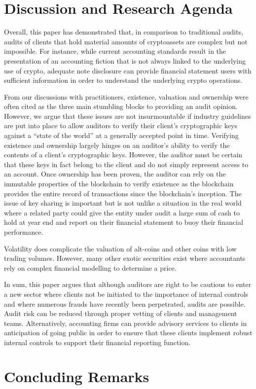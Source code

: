 \section{Discussion and Research Agenda}

Overall, this paper has demonstrated that, in comparison to traditional audits, audits of clients that hold material amounts of cryptoassets are complex but not impossible. For instance, while current accounting standards result in the presentation of an accounting fiction that is not always linked to the underlying use of crypto, adequate note disclosure can provide financial statement users with sufficient information in order to understand the underlying crypto operations. 

From our discussions with practitioners, existence, valuation and ownership were often cited as the three main stumbling blocks to providing an audit opinion. However, we argue that these issues are not insurmountable if industry guidelines are put into place to allow auditors to verify their client’s cryptographic keys against a “state of the world” at a generally accepted point in time. Verifying existence and ownership largely hinges on an auditor’s ability to verify the contents of a client’s cryptographic keys. However, the auditor must be certain that these keys in fact belong to the client and do not simply represent access to an account. Once ownership has been proven, the auditor can rely on the immutable properties of the blockchain to verify existence as the blockchain provides the entire record of transactions since the blockchain’s inception. The issue of key sharing is important but is not unlike a situation in the real world where a related party could give the entity under audit a large sum of cash to hold at year end and report on their financial statement to buoy their financial performance. 

Volatility does complicate the valuation of alt-coins and other coins with low trading volumes. However, many other exotic securities exist where accountants rely on complex financial modelling to determine a price. 

In sum, this paper argues that although auditors are right to be cautious to enter a new sector where clients not be initiated to the importance of internal controls and where numerous frauds have recently been perpetrated, audits are possible. Audit risk can be reduced through proper vetting of clients and management teams. Alternatively, accounting firms can provide advisory services to clients in anticipation of going public in order to ensure that these clients implement robust internal controls to support their financial reporting function. 

\section{Concluding Remarks}



